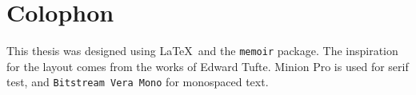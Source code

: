 \pagestyle{empty}
\hfill
\vfill
\section*{Colophon}
This thesis was designed using \LaTeX\ and the \texttt{memoir} package. The inspiration for the layout comes from the works of Edward Tufte. Minion Pro is used for serif test, and \texttt{Bitstream Vera Mono} for monospaced text.
\bigskip
\noindent
